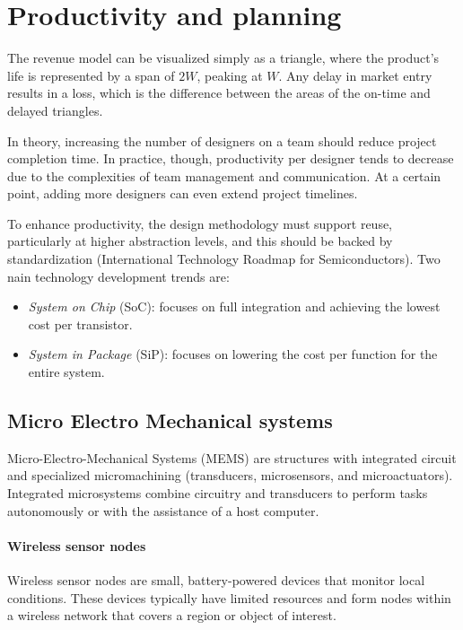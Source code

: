 \section{Productivity and planning}

The revenue model can be visualized simply as a triangle, where the product's life is represented by a span of $2W$, peaking at $W$. 
Any delay in market entry results in a loss, which is the difference between the areas of the on-time and delayed triangles.

In theory, increasing the number of designers on a team should reduce project completion time. 
In practice, though, productivity per designer tends to decrease due to the complexities of team management and communication. 
At a certain point, adding more designers can even extend project timelines.

To enhance productivity, the design methodology must support reuse, particularly at higher abstraction levels, and this should be backed by standardization (International Technology Roadmap for Semiconductors). 
Two nain technology development trends are: 
\begin{itemize}
    \item \textit{System on Chip} (SoC): focuses on full integration and achieving the lowest cost per transistor. 
    \item \textit{System in Package} (SiP): focuses on lowering the cost per function for the entire system.
\end{itemize}

\subsection{Micro Electro Mechanical systems}
Micro-Electro-Mechanical Systems (MEMS) are structures with integrated circuit and specialized micromachining (transducers, microsensors, and microactuators). 
Integrated microsystems combine circuitry and transducers to perform tasks autonomously or with the assistance of a host computer.

\paragraph*{Wireless sensor nodes}
Wireless sensor nodes are small, battery-powered devices that monitor local conditions.
These devices typically have limited resources and form nodes within a wireless network that covers a region or object of interest. 